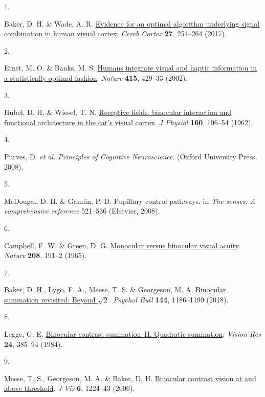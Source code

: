 \documentclass[
]{article}
\newlength{\cslhangindent}
\newlength{\csllabelwidth}
\newlength{\cslentryspacingunit} %
\newenvironment{CSLReferences}[2] %
 {%
  \setlength{\parindent}{0pt}
  \ifodd #1
  \let\oldpar\par
  \def\par{\hangindent=\cslhangindent\oldpar}
  \fi
  \setlength{\parskip}{#2\cslentryspacingunit}
 }%
 {}
\newcommand{\CSLLeftMargin}[1]{\parbox[t]{\csllabelwidth}{#1}}
\newcommand{\CSLRightInline}[1]{\parbox[t]{\linewidth - \csllabelwidth}{#1}\break}
\begin{document}
\hypertarget{refs}{}
\begin{CSLReferences}{0}{0}
\leavevmode{}%
\CSLLeftMargin{1. }%
\CSLRightInline{Baker, D. H. \& Wade, A. R. \href{https://doi.org/10.1093/cercor/bhw395}{Evidence for an optimal algorithm underlying signal combination in human visual cortex}. \emph{Cereb Cortex} \textbf{27}, 254--264 (2017).}

\leavevmode{}%
\CSLLeftMargin{2. }%
\CSLRightInline{Ernst, M. O. \& Banks, M. S. \href{https://doi.org/10.1038/415429a}{Humans integrate visual and haptic information in a statistically optimal fashion}. \emph{Nature} \textbf{415}, 429--33 (2002).}

\leavevmode{}%
\CSLLeftMargin{3. }%
\CSLRightInline{Hubel, D. H. \& Wiesel, T. N. \href{https://doi.org/10.1113/jphysiol.1962.sp006837}{Receptive fields, binocular interaction and functional architecture in the cat's visual cortex}. \emph{J Physiol} \textbf{160}, 106--54 (1962).}

\leavevmode{}%
\CSLLeftMargin{4. }%
\CSLRightInline{Purves, D. \emph{et al.} \emph{Principles of {Cognitive} {Neuroscience}}. (Oxford University Press, 2008).}

\leavevmode{}%
\CSLLeftMargin{5. }%
\CSLRightInline{McDougal, D. H. \& Gamlin, P. D. Pupillary control pathways. in \emph{The senses: A comprehensive reference} 521--536 (Elsevier, 2008).}

\leavevmode{}%
\CSLLeftMargin{6. }%
\CSLRightInline{Campbell, F. W. \& Green, D. G. \href{https://doi.org/10.1038/208191a0}{Monocular versus binocular visual acuity}. \emph{Nature} \textbf{208}, 191--2 (1965).}

\leavevmode{}%
\CSLLeftMargin{7. }%
\CSLRightInline{Baker, D. H., Lygo, F. A., Meese, T. S. \& Georgeson, M. A. \href{https://doi.org/10.1037/bul0000163}{Binocular summation revisited: Beyond \(\sqrt{2}\)}. \emph{Psychol Bull} \textbf{144}, 1186--1199 (2018).}

\leavevmode{}%
\CSLLeftMargin{8. }%
\CSLRightInline{Legge, G. E. \href{https://doi.org/10.1016/0042-6989(84)90064-6}{Binocular contrast summation--II. Quadratic summation}. \emph{Vision Res} \textbf{24}, 385--94 (1984).}

\leavevmode{}%
\CSLLeftMargin{9. }%
\CSLRightInline{Meese, T. S., Georgeson, M. A. \& Baker, D. H. \href{https://doi.org/10.1167/6.11.7}{Binocular contrast vision at and above threshold}. \emph{J Vis} \textbf{6}, 1224--43 (2006).}


\end{CSLReferences}
\end{document}
